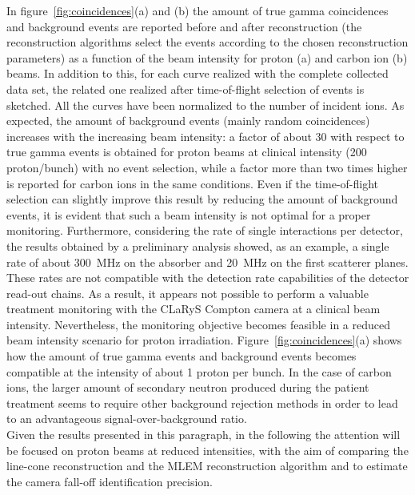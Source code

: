 In figure~\ref{fig:coincidences}(a) and (b) the amount of true gamma coincidences and background events are reported before and after reconstruction (the reconstruction algorithms select the events according to the chosen reconstruction parameters) as a function of the beam intensity for proton (a) and carbon ion (b) beams. In addition to this, for each curve realized with the complete collected data set, the related one realized after time-of-flight selection of events is sketched. All the curves have been normalized to the number of incident ions.\newline
As expected, the amount of background events (mainly random coincidences) increases with the increasing beam intensity: a factor of about 30 with respect to true gamma events is obtained for proton beams at clinical intensity (200 proton/bunch) with no event selection, while a factor more than two times higher is reported for carbon ions in the same conditions. Even if the time-of-flight selection can slightly improve this result by reducing the amount of background events, it is evident that such a beam intensity is not optimal for a proper monitoring. Furthermore, considering the rate of single interactions per detector, the results obtained by a preliminary analysis showed, as an example, a single rate of about 300~MHz on the absorber and 20~MHz on the first scatterer planes. These rates are not compatible with the detection rate capabilities of the detector read-out chains. As a result, it appears not possible to perform a valuable treatment monitoring with the CLaRyS Compton camera at a clinical beam intensity.\newline
Nevertheless, the monitoring objective becomes feasible in a reduced beam intensity scenario for proton irradiation. Figure~\ref{fig:coincidences}(a) shows how the amount of true gamma events and background events becomes compatible at the intensity of about 1 proton per bunch. In the case of carbon ions, the larger amount of secondary neutron produced during the patient treatment seems to require other background rejection methods in order to lead to an advantageous signal-over-background ratio.\\
\newline
Given the results presented in this paragraph, in the following the attention will be focused on proton beams at reduced intensities, with the aim of comparing the line-cone reconstruction and the MLEM reconstruction algorithm and to estimate the camera fall-off identification precision.

